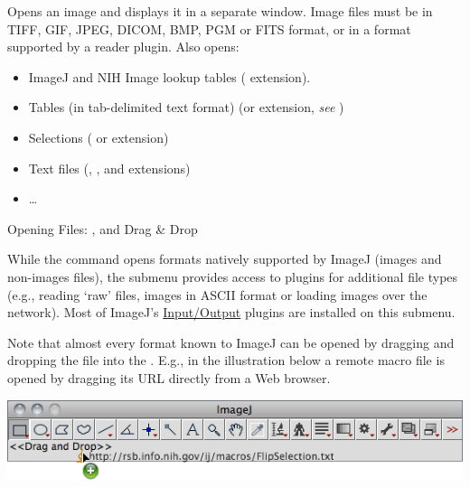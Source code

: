 Opens an image and displays it in a separate window. Image files must
be in TIFF, GIF, JPEG, DICOM, BMP, PGM or FITS format, or in a format
supported by a reader plugin. Also opens:
\begin{itemize}
\item ImageJ and NIH Image lookup tables ( extension). 
\item Tables (in tab-delimited text format) (or 
extension, \emph{see} )
\item Selections ( or  extension)
\item Text files (, , 
and  extensions)
\item \ldots{}
\end{itemize}


\noindent {\small }
\begin{infobox}
\caption{\label{infobox:Open-Import}Opening Files: \protect{},
\protect{}
and Drag \& Drop}


\noindent While the 
command opens formats natively supported by ImageJ (images and non-images
files), the 
submenu provides access to plugins for additional file types (e.g.,
reading `raw' files, images in ASCII format or loading images over
the network). Most of ImageJ's \href{http://imagej.nih.gov/ij/plugins/\#io}{Input/Output}
plugins are installed on this submenu.\medskip{}


\noindent Note that almost every format known to ImageJ can be opened
by dragging and dropping the file
into the . E.g., in the illustration
below a remote macro file is opened by dragging its URL
directly from a Web browser.

\noindent \begin{centering}
\vspace*{\smallskipamount}

\par\end{centering}

\noindent \centering{}\includegraphics[scale=0.55]{images/DragAndDrop}
\end{infobox}
{\small \par}


